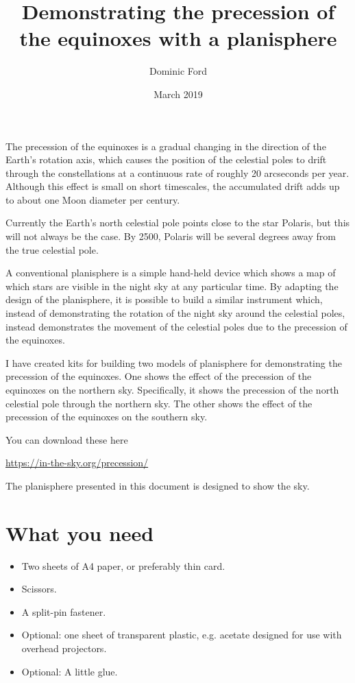 \documentclass[a4paper,onecolumn,10pt]{article}
\title{Demonstrating the precession of the equinoxes with a planisphere}
\author{Dominic Ford}
\date{March 2019}
\begin{document}
\maketitle
\setcounter{footnote}{1}

The precession of the equinoxes is a gradual changing in the direction of the
Earth's rotation axis, which causes the position of the celestial poles to
drift through the constellations at a continuous rate of roughly 20 arcseconds
per year. Although this effect is small on short timescales, the accumulated
drift adds up to about one Moon diameter per century.

Currently the Earth's north celestial pole points close to the star Polaris,
but this will not always be the case.  By 2500, Polaris will be several degrees
away from the true celestial pole.

A conventional planisphere is a simple hand-held device which shows a map of
which stars are visible in the night sky at any particular time. By adapting
the design of the planisphere, it is possible to build a similar instrument
which, instead of demonstrating the rotation of the night sky around the
celestial poles, instead demonstrates the movement of the celestial poles due
to the precession of the equinoxes.

I have created kits for building two models of planisphere for demonstrating
the precession of the equinoxes. One shows the effect of the precession of the
equinoxes on the northern sky.  Specifically, it shows the precession of the
north celestial pole through the northern sky. The other shows the effect of
the precession of the equinoxes on the southern sky.

You can download these here

\url{https://in-the-sky.org/precession/}

The planisphere presented in this document is designed to show the
 sky.
 
\section*{What you need}

\begin{itemize}
\item Two sheets of A4 paper, or preferably thin card.
\item Scissors.
\item A split-pin fastener.
\item Optional: one sheet of transparent plastic, e.g. acetate designed for use with overhead projectors.
\item Optional: A little glue.
\end{itemize}
\end{document}
